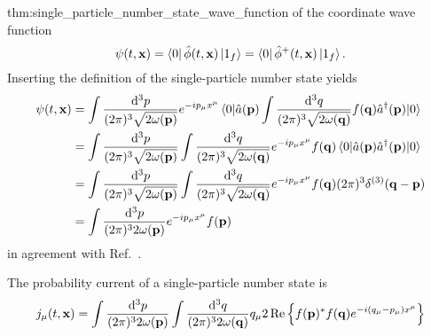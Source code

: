 \begin{delayedproof}{thm:single_particle_number_state_wave_function}
	of the coordinate wave function
	\begin{equation*}
		\psi(t,\vb{x})
		=
		\bra{0}
		\hat\phi(t,\vb{x})
		\ket{1_f}
		=
		\bra{0}
		\hat\phi^+(t,\vb{x})
		\ket{1_f}
		.
	\end{equation*}
	Inserting the definition of the single-particle number state yields
	\begin{equation*}
		\begin{split}
			\psi(t,\vb{x})
			&=
			\int\frac{\dd[3]{p}}{(2\pi)^3\sqrt{2\omega(\vb{p})}}
			e^{-ip_\mu x^\mu}
			\expval{
				\hat{a}(\vb{p})
				\int\frac{\dd[3]{q}}{(2\pi)^3\sqrt{2\omega(\vb{q})}}
				f(\vb{q})
				\hat{a}^\dagger(\vb{p})
			}{0}
			\\
			&=
			\int\frac{\dd[3]{p}}{(2\pi)^3\sqrt{2\omega(\vb{p})}}
			\int\frac{\dd[3]{q}}{(2\pi)^3\sqrt{2\omega(\vb{q})}}
			e^{-ip_\mu x^\mu}
			f(\vb{q})
			\expval{
				\hat{a}(\vb{p})
				\hat{a}^\dagger(\vb{p})
			}{0}
			\\
			&=
			\int\frac{\dd[3]{p}}{(2\pi)^3\sqrt{2\omega(\vb{p})}}
			\int\frac{\dd[3]{q}}{(2\pi)^3\sqrt{2\omega(\vb{q})}}
			e^{-ip_\mu x^\mu}
			f(\vb{q})
			(2\pi)^3
			\delta^{(3)}(\vb{q}-\vb{p})
			\\
			&=
			\int\frac{\dd[3]{p}}{(2\pi)^32\omega(\vb{p})}
			e^{-ip_\mu x^\mu}
			f(\vb{p})
		\end{split}
	\end{equation*}
	in agreement with Ref.~\cite[eq.~4]{Naumov2013}.
\end{delayedproof}
\begin{lemma}
	The probability current of a single-particle number state is
	\begin{equation}
		j_\mu(t,\vb{x})
		=
		\int\frac{\dd[3]{p}}{(2\pi)^32\omega(\vb{p})}
		\int\frac{\dd[3]{q}}{(2\pi)^32\omega(\vb{q})}
		q_\mu
		2\operatorname{\operatorname{Re}}\left\{
			f(\vb{p})^*
			f(\vb{q})
			e^{-i(q_\mu-p_\mu)x^\mu}
		\right\}
	\end{equation}
\end{lemma}
